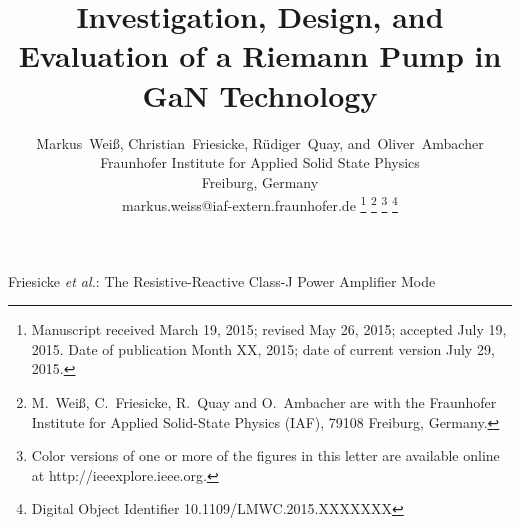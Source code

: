 \documentclass[journal]{IEEEtran}
\begin{document}
\title{Investigation, Design, and Evaluation of a Riemann Pump in GaN Technology}
\author{%
	Markus~Wei\ss{},
    Christian~Friesicke,
    R\"{u}diger~Quay,
    and~Oliver~Ambacher\\
    Fraunhofer Institute for Applied Solid State Physics\\
    Freiburg, Germany\\
    markus.weiss@iaf-extern.fraunhofer.de%
    \thanks{%
      Manuscript received March 19, 2015;
      revised May 26, 2015;
      accepted July 19, 2015.
      Date of publication Month XX, 2015;
      date of current version July 29, 2015.      
    }%
    \thanks{M.~Wei\ss{}, C.~Friesicke, R.~Quay and O.~Ambacher are with the Fraunhofer Institute for Applied Solid-State
      Physics (IAF), 79108 Freiburg, Germany.%
    }%
    \thanks{%
      Color versions of one or more of the figures in this letter are available
      online at http://ieeexplore.ieee.org.}
    \thanks{%
      Digital Object Identifier 10.1109/LMWC.2015.XXXXXXX%
    }%
}

%
         {Friesicke \MakeLowercase{\textit{et al.}}:
          The Resistive-Reactive Class-J Power Amplifier Mode}

\maketitle


\end{document}
